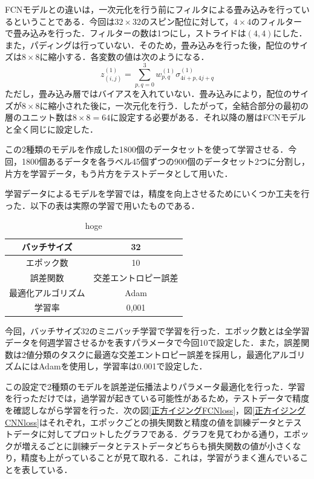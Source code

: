 \documentclass[a4paper,11pt]{jsreport}
\begin{document}
FCNモデルとの違いは，一次元化を行う前にフィルタによる畳み込みを行っているということである．今回は$32 \times 32$のスピン配位に対して，$4 \times 4$のフィルターで畳み込みを行った．フィルターの数は1つにし，ストライドは$(4,4)$にした．また，パディングは行っていない．そのため，畳み込みを行った後，配位のサイズは$8 \times 8$に縮小する．各変数の値は次のようになる．
\begin{equation}
  z_{(i,j)}^{(1)}
  = \sum_{p,q=0}^{3} w_{p,q}^{(1)} \sigma_{4i+p,4j+q}^{(1)}
\end{equation}
ただし，畳み込み層ではバイアスを入れていない．畳み込みにより，配位のサイズが$8 \times 8$に縮小された後に，一次元化を行う．したがって，全結合部分の最初の層のユニット数は$8 \times 8 = 64$に設定する必要がある．それ以降の層はFCNモデルと全く同じに設定した．\par
この2種類のモデルを作成した1800個のデータセットを使って学習させる．今回，1800個あるデータを各ラベル45個ずつの900個のデータセット2つに分割し，片方を学習データ，もう片方をテストデータとして用いた．\par
学習データによるモデルを学習では，精度を向上させるためにいくつか工夫を行った．以下の表は実際の学習で用いたものである．

\begin{table}[]
  \centering
  \begin{tabular}{cc} \hline
    バッチサイズ & 32 \rule[0pt]{0pt}{1pt} \\ \hline
    エポック数 & 10 \rule[0pt]{0pt}{1pt} \\ \hline
    誤差関数 & 交差エントロピー誤差 \rule[0pt]{0pt}{1pt} \\\hline
    最適化アルゴリズム & Adam \rule[0pt]{0pt}{1pt} \\\hline
    学習率 & 0,001 \rule[0pt]{0pt}{1pt} \\\hline
  \end{tabular}
  \caption{hoge}
  \label{学習で用いたもの}
\end{table}

今回，バッチサイズ32のミニバッチ学習で学習を行った．エポック数とは全学習データを何週学習させるかを表すパラメータで今回10で設定した．また，誤差関数は2値分類のタスクに最適な交差エントロピー誤差を採用し，最適化アルゴリズムにはAdamを使用し，学習率は0.001で設定した．\par
この設定で2種類のモデルを誤差逆伝播法よりパラメータ最適化を行った．学習を行っただけでは，過学習が起きている可能性があるため，テストデータで精度を確認しながら学習を行った．次の図\ref{正方イジングFCNloss}，図\ref{正方イジングCNNloss}はそれぞれ，エポックごとの損失関数と精度の値を訓練データとテストデータに対してプロットしたグラフである．グラフを見てわかる通り，エポックが増えるごとに訓練データとテストデータどちらも損失関数の値が小さくなり，精度も上がっていることが見て取れる．これは，学習がうまく進んでいることを表している．
\end{document}

